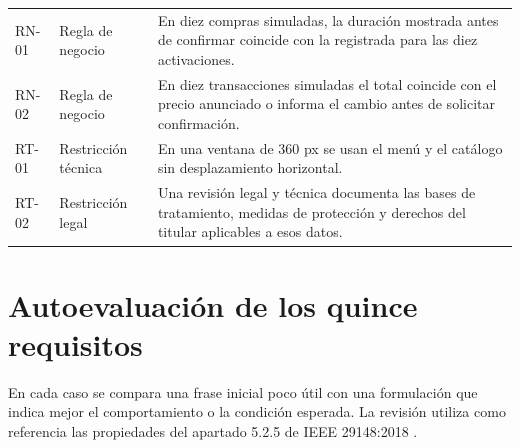 \documentclass[12pt,a4paper]{article}
\begin{document}
\begin{longtable}{@{}P{1.30cm}P{3.35cm}P{9.05cm}@{}}
RN-01 & Regla de negocio & En diez compras simuladas, la duración mostrada antes de confirmar coincide con la registrada para las diez activaciones.\\
RN-02 & Regla de negocio & En diez transacciones simuladas el total coincide con el precio anunciado o informa el cambio antes de solicitar confirmación.\\
RT-01 & Restricción técnica & En una ventana de 360 px se usan el menú y el catálogo sin desplazamiento horizontal.\\
RT-02 & Restricción legal & Una revisión legal y técnica documenta las bases de tratamiento, medidas de protección y derechos del titular aplicables a esos datos.\\
\bottomrule
\end{longtable}
\normalsize
\section{Autoevaluación de los quince requisitos}
En cada caso se compara una frase inicial poco útil con una formulación que indica mejor el comportamiento o la condición esperada. La revisión utiliza como referencia las propiedades del apartado 5.2.5 de IEEE 29148:2018 \cite{ieee29148}.
\end{document}
